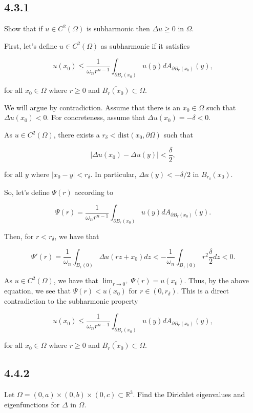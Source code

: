 \documentclass{article}
\begin{document}
\subsection{\textbf{4.3.1}} Show that if $u\in C^2(\Omega)$ is subharmonic then $\Delta u\geq 0$ in $\Omega$.

First, let's define $u\in C^2(\Omega)$ as subharmonic if it satisfies 

$$u(x_0)\leq \frac{1}{\omega_n r^{n-1}}\int_{\partial B_r(x_0)}u(y)dA_{\partial B_r(x_0)}(y),$$

for all $x_0\in\Omega$ where $r\geq 0$ and $\overline{B_r(x_0)}\subset\Omega$.

We will argue by contradiction. Assume that there is an $x_0\in\Omega$ such that $\Delta u(x_0)<0$. For concreteness, assume that $\Delta u(x_0)=-\delta<0$.

As $u\in C^2(\Omega)$, there exists a $r_{\delta} < \mathrm{dist}(x_0,\partial\Omega)$ such that

$$|\Delta u(x_0)- \Delta u(y)| < \frac{\delta}{2},$$

for all $y$ where $|x_0-y|<r_{\delta}$. In particular, $\Delta u(y)< -\delta/2$ in $B_{r_\delta}(x_0)$.

So, let's define $\Psi(r)$ according to

$$\Psi(r)=\frac{1}{\omega_n r^{n-1}}\int_{\partial B_r(x_0)}u(y)dA_{\partial B_r(x_0)}(y).$$

Then, for $r<r_\delta$, we have that

$$\Psi'(r)=\frac{1}{\omega_n} \int_{B_1(0)} \Delta u(rz + x_0)dz < -\frac{1}{\omega_n} \int_{B_1(0)} r^2\frac{\delta}{2}dz < 0.$$

As $u\in C^2(\Omega)$, we have that $\lim_{r\to 0^+}\Psi(r)=u(x_0)$. Thus, by the above equation, we see that $\Psi(r)<u(x_0)$ for $r\in(0,r_{\delta})$. This is a direct contradiction to the subharmonic property

$$u(x_0)\leq \frac{1}{\omega_n r^{n-1}}\int_{\partial B_r(x_0)}u(y)dA_{\partial B_r(x_0)}(y),$$

for all $x_0\in\Omega$ where $r\geq 0$ and $\overline{B_r(x_0)}\subset\Omega$.

\subsection{\textbf{4.4.2}} Let $\Omega=(0,a)\times(0,b)\times(0,c)\subset \mathbb R^3$. Find the Dirichlet eigenvalues and eigenfunctions for $\Delta$ in $\Omega$.
\end{document}
